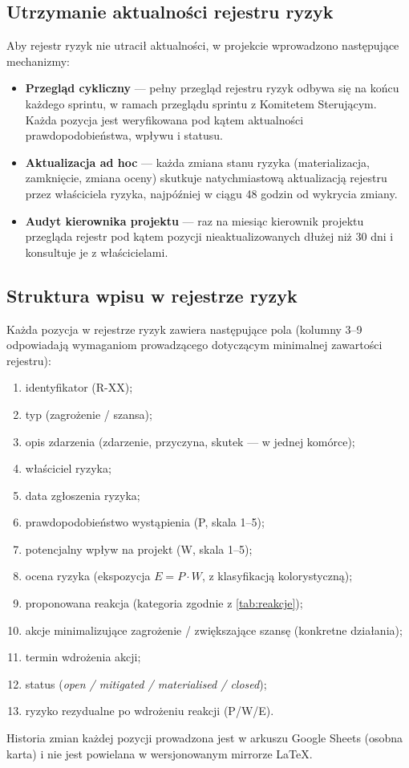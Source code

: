 \documentclass[11pt,a4paper]{article}
\begin{document}
	\subsection{Utrzymanie aktualności rejestru ryzyk}
	Aby rejestr ryzyk nie utracił aktualności, w projekcie wprowadzono następujące mechanizmy:
	\begin{itemize}[noitemsep]
		\item \textbf{Przegląd cykliczny} --- pełny przegląd rejestru ryzyk odbywa się na końcu każdego sprintu, w ramach przeglądu sprintu z Komitetem Sterującym. Każda pozycja jest weryfikowana pod kątem aktualności prawdopodobieństwa, wpływu i statusu.
		\item \textbf{Aktualizacja ad hoc} --- każda zmiana stanu ryzyka (materializacja, zamknięcie, zmiana oceny) skutkuje natychmiastową aktualizacją rejestru przez właściciela ryzyka, najpóźniej w ciągu 48 godzin od wykrycia zmiany.
		\item \textbf{Audyt kierownika projektu} --- raz na miesiąc kierownik projektu przegląda rejestr pod kątem pozycji nieaktualizowanych dłużej niż 30 dni i konsultuje je z właścicielami.
	\end{itemize}
	
	\subsection{Struktura wpisu w rejestrze ryzyk}\label{sec:struktura-wpisu}
	Każda pozycja w rejestrze ryzyk zawiera następujące pola (kolumny 3--9 odpowiadają wymaganiom prowadzącego dotyczącym minimalnej zawartości rejestru):
	\begin{enumerate}[noitemsep]
		\item identyfikator (R-XX);
		\item typ (zagrożenie / szansa);
		\item opis zdarzenia (zdarzenie, przyczyna, skutek --- w jednej komórce);
		\item właściciel ryzyka;
		\item data zgłoszenia ryzyka;
		\item prawdopodobieństwo wystąpienia (P, skala 1--5);
		\item potencjalny wpływ na projekt (W, skala 1--5);
		\item ocena ryzyka (ekspozycja $E = P \cdot W$, z klasyfikacją kolorystyczną);
		\item proponowana reakcja (kategoria zgodnie z \cref{tab:reakcje});
		\item akcje minimalizujące zagrożenie / zwiększające szansę (konkretne działania);
		\item termin wdrożenia akcji;
		\item status (\textit{open / mitigated / materialised / closed});
		\item ryzyko rezydualne po wdrożeniu reakcji (P/W/E).
	\end{enumerate}
	Historia zmian każdej pozycji prowadzona jest w arkuszu Google Sheets (osobna karta) i nie jest powielana w wersjonowanym mirrorze \LaTeX{}.
	
\end{document}

